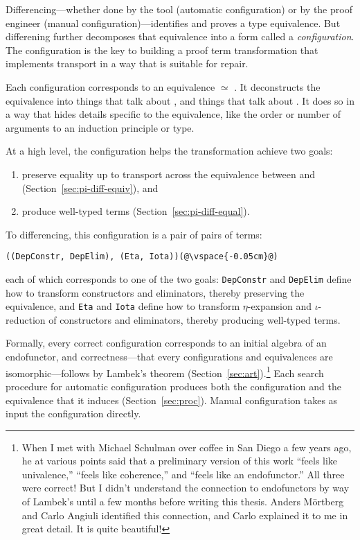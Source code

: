 Differencing---whether done by the tool (automatic configuration) or by the proof engineer (manual configuration)---identifies 
and proves a type equivalence. But differening further decomposes that equivalence into a form called a \textit{configuration}. 
The configuration is the key to building a proof term transformation that implements transport in a way that is suitable for repair.

Each configuration corresponds to an equivalence \Aa $\simeq$ \B.
It deconstructs the equivalence into things that talk about \Aa, and things that talk about \B.
It does so in a way that hides details
specific to the equivalence, like the order or number of arguments to an induction principle or type.

At a high level, the configuration helps the transformation achieve two goals: 

\begin{enumerate}
\item preserve equality up to transport across the equivalence between \Aa and \B (Section~\ref{sec:pi-diff-equiv}), and 
\item produce well-typed terms (Section~\ref{sec:pi-diff-equal}).
\end{enumerate}
To differencing, this configuration is a pair of pairs of terms:

\begin{lstlisting}
((DepConstr, DepElim), (Eta, Iota))(@\vspace{-0.05cm}@)
\end{lstlisting}
each of which corresponds to one of the two goals:
\lstinline{DepConstr} and \lstinline{DepElim} define how to transform constructors and eliminators, thereby preserving the equivalence, and 
\lstinline{Eta} and \lstinline{Iota} define how to transform $\eta$-expansion and $\iota$-reduction of constructors and eliminators, thereby producing well-typed terms.

Formally, every correct configuration corresponds to an initial algebra of an endofunctor,
and correctness---that every configurations and equivalences are isomorphic---follows by Lambek's theorem (Section~\ref{sec:art}).\footnote{When I met with Michael Schulman over coffee in San Diego a few years ago, he at various points said that a preliminary version of this work ``feels like univalence,'' ``feels like coherence,'' and ``feels like an endofunctor.'' All three were correct! But I didn't understand the connection to endofunctors by way of Lambek's until a few months before writing this thesis.
Anders M\"{o}rtberg and Carlo Angiuli identified this connection, and Carlo explained it to me in great detail.
It is quite beautiful!}  %
Each search procedure for automatic configuration produces both the configuration and the equivalence that it induces (Section~\ref{sec:proc}).
Manual configuration takes as input the configuration directly.


